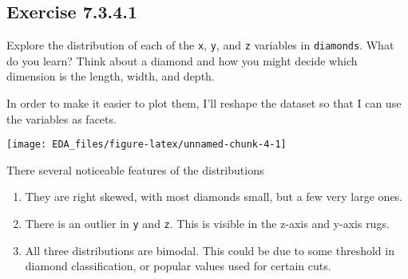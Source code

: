 \documentclass[]{book}
\newenvironment{Shaded}{\begin{snugshade}}{\end{snugshade}}
\newcommand{\DataTypeTok}[1]{\textcolor[rgb]{0.13,0.29,0.53}{#1}}
\newcommand{\KeywordTok}[1]{\textcolor[rgb]{0.13,0.29,0.53}{\textbf{#1}}}
\newcommand{\NormalTok}[1]{#1}
\newcommand{\OperatorTok}[1]{\textcolor[rgb]{0.81,0.36,0.00}{\textbf{#1}}}
\newcommand{\StringTok}[1]{\textcolor[rgb]{0.31,0.60,0.02}{#1}}
\theoremstyle{plain}
\theoremstyle{remark}
\begin{document}
\hypertarget{exercise-7.3.4.1}{%
\subsection*{\texorpdfstring{Exercise
{7.3.4.1}}{Exercise 7.3.4.1}}\label{exercise-7.3.4.1}}

Explore the distribution of each of the \texttt{x}, \texttt{y}, and
\texttt{z} variables in \texttt{diamonds}. What do you learn? Think
about a diamond and how you might decide which dimension is the length,
width, and depth.

In order to make it easier to plot them, I'll reshape the dataset so
that I can use the variables as facets.

\begin{Shaded}
\end{Shaded}

\begin{center}\texttt{[image: EDA\_files/figure-latex/unnamed-chunk-4-1]} \end{center}

There several noticeable features of the distributions

\begin{enumerate}
\def\labelenumi{\arabic{enumi}.}
\item
  They are right skewed, with most diamonds small, but a few very large
  ones.
\item
  There is an outlier in \texttt{y} and \texttt{z}. This is visible in
  the z-axis and y-axis rugs.
\item
  All three distributions are bimodal. This could be due to some
  threshold in diamond classification, or popular values used for
  certain cuts.
\end{enumerate}
\end{document}
